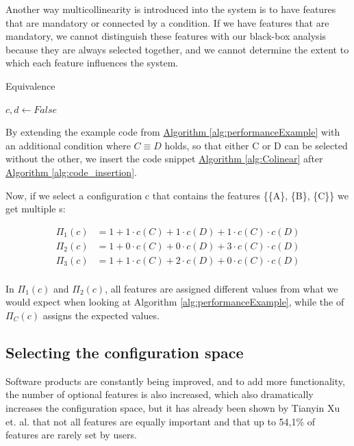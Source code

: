 Another way  multicollinearity is introduced into the system is to have features that are mandatory or connected by a condition. 
If we have features that are mandatory, we cannot distinguish these features with our black-box analysis because they are always selected
together, and we cannot determine the extent to which each feature influences the system. \cite{Multicollinearity}

\begin{algorithm}[h]
    \caption{Equivalence \label{alg:Colinear}}
    \begin{algorithmic}[1]

        \State $c,d \gets False$
    \EndIf

    \end{algorithmic}
    \end{algorithm}

By extending the example code from \hyperref[alg:performanceExample]{Algorithm \ref*{alg:performanceExample}} with an additional condition where $C \equiv D$ holds, 
so that either C or D can be selected without the other, we insert the code snippet  \hyperref[alg:Colinear]{Algorithm \ref*{alg:Colinear}} 
after \hyperref[alg:code_insertion]{Algorithm \ref*{alg:code_insertion}}.

Now, if we select a configuration c that contains the features \{\{A\}, \{B\}, \{C\}\} we get multiple {\perfInfluenceModel}s:

\begin{align*}
    \Pi_1(c) &= 1 + 1\cdot c(C) + 1 \cdot c(D) + 1\cdot c(C) \cdot c(D) \\
    \Pi_2(c) &= 1 + 0\cdot c(C) + 0 \cdot c(D) + 3\cdot c(C) \cdot c(D) \\
    \Pi_3(c) &= 1 + 1\cdot c(C) + 2 \cdot c(D) + 0\cdot c(C) \cdot c(D) \\
\end{align*}

In $\Pi_1(c)$ and $\Pi_2(c)$, all features are assigned different values from what we would expect when looking at Algorithm \ref{alg:performanceExample},
while the \perfInfluenceModel of $\Pi_C(c)$ assigns the expected values.

\subsection{Selecting the configuration space}
Software products are constantly being improved, and to add more functionality, the number of optional features is also increased, which also dramatically increases 
the configuration space, but it has already been shown by Tianyin Xu et. al. \cite{TooManyKnobs} that not all features are equally important and that up to
54,1\% of features are rarely set by users.

